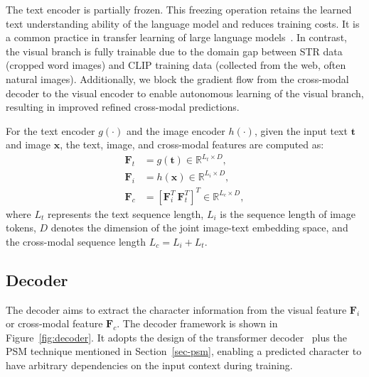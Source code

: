 \documentclass[lettersize,journal]{IEEEtran}
\begin{document}
The text encoder is partially frozen.
This freezing operation retains the learned text understanding ability of the language model and reduces training costs.
It is a common practice in transfer learning of large language models~\cite{2022_alayrac_flamingo}.
In contrast, the visual branch is fully trainable due to the domain gap between STR data (cropped word images) and CLIP training data (collected from the web, often natural images). 
Additionally, we block the gradient flow from the cross-modal decoder to the visual encoder to enable autonomous learning of the visual branch, resulting in improved refined cross-modal predictions.

For the text encoder $g(\cdot)$ and the image encoder $h(\cdot)$, given the input text $\bm{t}$ and image $\bm{x}$, the text,
image, and cross-modal features are computed as:
\begin{align}
    \bm{F}_t &= g(\bm{t}) \in \mathbb{R}^{L_t\times D}, \\
    \bm{F}_i &= h(\bm{x}) \in \mathbb{R}^{L_i\times D},\\
    \bm{F}_c &= [\bm{F}_i^T ~\bm{F}_t^T]^T \in \mathbb{R}^{L_c\times D},
\end{align}
where $L_t$ represents the text
sequence length, $L_i$ is the 
sequence length of image tokens,
$D$ denotes the dimension of the joint image-text embedding space,
and the cross-modal sequence length $L_c = L_i + L_t$.



\subsection{Decoder} \label{sec:dec}
The decoder aims to extract the character information
from the visual feature
$\bm{F}_i$ or cross-modal feature $\bm{F}_c$.
The decoder framework is shown in Figure~\ref{fig:decoder}.
It adopts the design of the transformer
decoder~\cite{2017_attention} plus the PSM technique mentioned in Section~\ref{sec-psm},
enabling a predicted character to have arbitrary dependencies on the input context during training.
\end{document}
